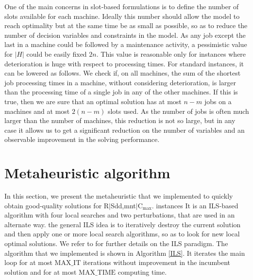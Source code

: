 \documentclass[a4paper,11pt]{article}
\begin{document}
One of the main concerns in slot-based formulations is to define the number of slots available for each machine. Ideally this number should allow the model to reach optimality but at the same time be as small as possible, so as to reduce the number of decision variables and constraints in the model. As any job except the last in a machine could be followed by a maintenance activity, a pessimistic value for $|H|$ could be easily fixed $2n$.  This value is reasonable only for instances where deterioration is huge with respect to processing times.  For standard instances, it can be lowered as follows. We check if, on all machines, the sum of the shortest job processing times in a machine, without considering deterioration, is larger than the processing time of a single job in any of the other machines. If this is true, then we are sure that an optimal solution has at most $n-m$ jobs on a machines and at most $2(n-m)$ slots used. As the number of jobs is often much larger than the number of machines, this reduction is not so large, but in any case it allows us to get a significant reduction on the number of variables and an observable improvement in the solving performance.  


\section{Metaheuristic algorithm} \label{sec:heuristic}%
%
In this section, we present the metaheuristic that we implemented to quickly obtain good-quality solutions for R$|$Sdd,mnt$|$C$_{\max}$. instances It is an ILS-based algorithm with four local searches and two perturbations, that are used in an alternate way. the general ILS idea is to iteratively destroy the current solution and then apply one or more local search algorithms, so as to look for new local optimal solutions. We refer to \cite{Lourenco2010} for further details on the ILS paradigm. The algorithm that we implemented is shown in Algorithm \ref{ILS}. It iterates the main loop for at most $\text{MAX}\_\text{IT}$ iterations without improvement in the incumbent solution and for at most $\text{MAX}\_\text{TIME}$ computing time. 
\end{document}
